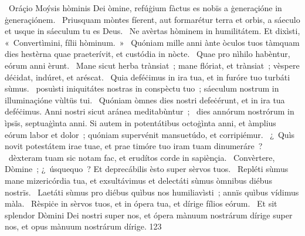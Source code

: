 {~Oráçio Moýsis hòminis Dei}
{%
òmine, refúġium fàctus es nobïs a ġeneraçióne in ġeneraçiónem.
~Priusquam mòntes fíerent, aut formarétur terra et orbis, a sáeculo et usque in sáeculum tu es Deus.
~Ne avèrtas hòminem in humilitátem. Et dixìsti, «~Convertìmini, fílii hòminum.~»
~Quóniam mille anni ànte òculos tuos tàmquam dies hestèrna quae praeterívit, et custódia in nòcte.
~Quae pro nìhilo habèntur, eórum anni èrunt.
~Mane sicut herba trànsiat~; mane flóriat, et trànsiat~; vèspere déċidat, indúret, et aréscat.
~Quia deféċimus in ira tua, et in furóre tuo turbáti sùmus.
~posuìsti iniquitátes nostras in conspèctu tuo~; sáeculum nostrum in illuminaçióne vùltüs tui.
~Quóniam òmnes dies nostri defeċérunt, et in ira tua deféċimus. Anni nostri sicut aránea meditabùntur~;
~dies annórum nostrórum in ìpsïs, septuaġìnta anni. Si autem in potentátibus octoġìnta anni, et àmplius eórum labor et dolor~; quóniam supervénit mansuetúdo, et corripiémur.
~¿~Quìs novit potestátem irae tuae, et prae timóre tuo iram tuam dinumeráre~?
~dèxteram tuam sic notam fac, et erudítos corde in sapiènçia.
~Convèrtere, Dòmine~; ¿~úsquequo~? Et deprecábilis èsto super sèrvos tuos.
~Repléti sùmus mane mizericórdia tua, et exsultávimus et delectáti sùmus òmnibus diébus nostrïs.
~Laetáti sùmus pro diébus quìbus nos humiliavìsti~; annïs quìbus vídimus màla.
~Rèspiċe in sèrvos tuos, et in ópera tua, et dírige fílios eórum.
~Et sit splendor Dòmini Dei nostri super nos, et ópera mànuum nostrárum dírige super nos, et opus mànuum nostrárum dírige.}
{12}{3}
